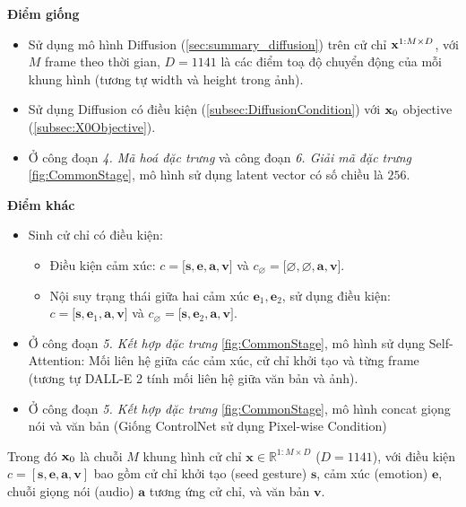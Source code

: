 \vspace{10pt}

\textbf{Điểm giống}
\begin{itemize}
	\item Sử dụng mô hình Diffusion (\autoref{sec:summary_diffusion}) trên cử chỉ $\mathbf{x}^{1:M \times D}$,  với $M$ frame theo thời gian, $D=1141$ là các điểm toạ độ chuyển động của mỗi khung hình (tương tự width và height trong ảnh).
	\item Sử dụng Diffusion có điều kiện (\autoref{subsec:DiffusionCondition}) với $\mathbf{x}_0$ objective (\autoref{subsec:X0Objective}).
	\item Ở công đoạn \textit{4. Mã hoá đặc trưng} và công đoạn \textit{6. Giải mã đặc trưng} \autoref{fig:CommonStage}, mô hình sử dụng latent vector có số chiều là $256$.
\end{itemize}

\textbf{Điểm khác}

\begin{itemize}
	\item Sinh cử chỉ có điều kiện:
	\begin{itemize}
		\item Điều kiện cảm xúc: $c = \big[ \mathbf{s}, \mathbf{e}, \mathbf{a}, \mathbf{v} \big]$ và $c_{\varnothing} = \big[ \varnothing, \varnothing, \mathbf{a}, \mathbf{v}\big]$.
		\item Nội suy trạng thái giữa hai cảm xúc $\mathbf{e}_1, \mathbf{e}_2$, sử dụng điều kiện: $c = \big[ \mathbf{s}, \mathbf{e}_1, \mathbf{a}, \mathbf{v} \big]$ và $c_{\varnothing} = \big[ \mathbf{s}, \mathbf{e}_2, \mathbf{a}, \mathbf{v} \big]$.
	\end{itemize}
	\item Ở công đoạn \textit{5. Kết hợp đặc trưng} \autoref{fig:CommonStage}, mô hình sử dụng Self-Attention: Mối liên hệ giữa các cảm xúc, cử chỉ khởi tạo và từng frame (tương tự DALL-E 2 tính mối liên hệ giữa văn bản và ảnh).
	\item Ở công đoạn \textit{5. Kết hợp đặc trưng} \autoref{fig:CommonStage}, mô hình concat giọng nói và văn bản (Giống ControlNet sử dụng Pixel-wise Condition)
\end{itemize}

Trong đó $\mathbf{x}_0$ là chuỗi $M$ khung hình cử chỉ $\mathbf{x} \in \mathbb{R}^{1:M \times D}$ ($D = 1141$), với điều kiện $c = [\mathbf{s}, \mathbf{e}, \mathbf{a}, \mathbf{v}]$ bao gồm cử chỉ khởi tạo (seed gesture) $\mathbf{s}$,  cảm xúc (emotion) $\mathbf{e}$, chuỗi giọng nói (audio) $\mathbf{a}$ tương ứng cử chỉ, và văn bản  $\mathbf{v}$.

